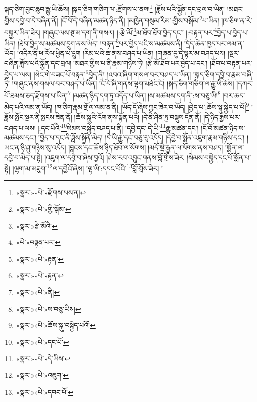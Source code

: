 སྐད་ཅིག་བྱང་ཆུབ་རྒྱུ་ཡི་ཆོས། །སྐད་ཅིག་གཅིག་ལ་:རྫོགས་པ་ནས།\footnote{«སྣར་»«པེ་»རྫོགས་པས་ན།} །ཟློས་པའི་སྐྱོན་དང་བྲལ་བ་ཡིན། །མཐར་གྱིས་དབྱེ་བ་དེ་བཞིན་ནོ། །ངོ་བོ་དེ་བཞིན་མཚན་ཉིད་ནི། །མཁྱེན་གསུམ་རིམ་:གྱིས་བསྒོམ་\footnote{«སྣར་»«པེ་»གྱི་སྒོམ་}པ་ཡིན། །ཁ་ཅིག་ན་རེ་བསྐྱར་ཡིན་ཟེར། །གཞུང་ལས་སྔ་མ་དག་ནི་གསལ། །:རྩེ་མོ་\footnote{«སྣར་»རྩེ་མོའི་}མ་ཐོབ་ཐོབ་བྱེད་དང་། །:བརྟན་པར་\footnote{«པེ་»བསྟན་པར་}བྱེད་པ་བྱེད་པ་ཡིན། །ཐོབ་བྱེད་ས་མཚམས་དྲུག་ནས་ཡོད། །བརྟན་\footnote{«སྣར་»«པེ་»རྟན་}པར་བྱེད་པའི་ས་མཚམས་ནི། །དྲོད་ཆེན་ཁྱད་པར་ལམ་ན་ཡོད། །འདིར་ནི་ཕ་རོལ་ཕྱིན་པ་དྲུག །རིམ་པའི་ཆ་ནས་བཤད་པ་ཡིན། །གཞན་དུ་དེ་ལྟར་མ་བཤད་པས། །སྔར་བཞིན་ཟློས་པའི་སྐྱོན་དང་བྲལ། །མཐར་གྱིས་པ་ནི་རྣམ་གཉིས་ཏེ། །རྩེ་མོ་ཐོབ་པར་བྱེད་པ་དང་། །ཐོབ་པ་བརྟན་པར་བྱེད་པ་ལས། །སེང་གེ་བཟང་པོ་བརྟན་\footnote{«སྣར་»«པེ་»རྟན་}བྱེད་ནི། །འབའ་ཞིག་གསལ་བར་བཤད་པ་ཡིན། །སྐད་ཅིག་དབྱེ་བ་རྣམ་བཞི་ཏེ། །གཞུང་ནས་གསལ་བར་བཤད་པ་ཡིན། །ངོ་བོ་ཞི་གནས་ལྷག་མཐོང་ངོ། །སྐད་ཅིག་གཅིག་ལ་རྒྱུ་ཡི་ཆོས། །དཀར་པོ་ཐམས་ཅད་རྫོགས་པ་ཡིན།\footnote{«སྣར་»«པེ་»ནི།} །མཚན་ཉིད་དག་ཏུ་འདོད་པ་ཡིན། །ས་མཚམས་དག་ནི་:ས་བཅུ་ཡི།\footnote{«སྣར་»«པེ་»ས་བཅུ་ཡིས།} །བར་ཆད་མེད་པའི་ལམ་ན་ཡོད། །ཁ་ཅིག་རྣམ་གྲོལ་ལམ་ན་ནི། །ཡོད་དོ་ཞེས་ཀྱང་ཟེར་བ་ཡོད། །བྱེད་པ་:ཆོས་སྐུ་སྐྱེད་པ་པོ།\footnote{«སྣར་»«པེ་»ཆོས་སྐུ་བསྐྱེད་པའོ།} །ཟློས་སྤོང་སྔར་ནི་སྤངས་ཟིན་ནོ། །ཆོས་སྐུའི་འོག་ནས་སྟོན་པའོ། །དེ་ནི་ཤིན་ཏུ་བསྡུས་དོན་ནོ། །དེ་ཉིད་རྒྱས་པར་བཤད་པ་ལས། །:དང་པོའི་\footnote{«སྣར་»«པེ་»དང་པོ་}སེམས་བསྐྱེད་བཤད་པ་ནི། །དབྱེ་དང་:དེ་ཡི་\footnote{«སྣར་»«པེ་»དེ་ཡིས་}རྒྱུ་མཚན་དང་། །ངོ་བོ་མཚན་ཉིད་ས་མཚམས་དང་། །བྱེད་པ་དང་ནི་ཟློས་སྐྱོན་མེད། །དེ་ཡི་རྒྱུ་དང་བཅུ་རུ་འདོད། །དབྱེ་བ་སྨོན་འཇུག་རྣམ་གཉིས་དང་། །ཡང་ན་ཉི་ཤུ་གཉིས་སུ་འདོད། །བླངས་དང་ཆོས་ཉིད་ཐོབ་ལ་སོགས། །མདོ་སྡེ་རྒྱན་ལ་སོགས་ནས་བཤད། །སྨོན་ལ་དབྱེ་བ་མེད་པ་སྟེ། །འཇུག་ལ་དབྱེ་བ་ཞེས་བྱའོ། །ཤེས་རབ་འབྱུང་གནས་བློ་གྲོས་ཟེར། །སེམས་བསྐྱེད་དང་པོ་སྨོན་པ་སྟེ། །ལྷག་མ་མཇུག་\footnote{«སྣར་»«པེ་»འཇུག་}ལ་དབྱེའོ་ཞེས། །ལྷ་ཡི་:དབང་པོའི་\footnote{«སྣར་»«པེ་»དབང་པོ་}བློ་གྲོས་ཟེར། །
